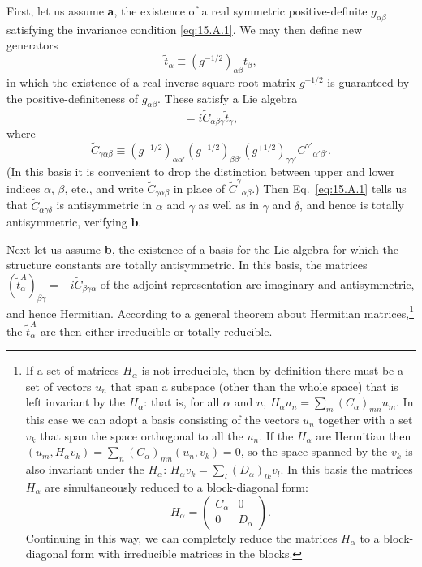 First, let us assume \textbf{a}, the existence of a real symmetric positive-definite $g_{\alpha\beta}$ satisfying the invariance condition \eqref{eq:15.A.1}. We may then define new generators
\begin{equation}
 \widetilde t_\alpha\equiv(g^{-1/2})_{\alpha\beta}t_\beta,
 \tag{15.A.3}\label{eq:15.A.3}
\end{equation}
in which the existence of a real inverse square-root matrix $g^{-1/2}$ is guaranteed by the positive-definiteness of $g_{\alpha\beta}$. These satisfy a Lie algebra
\begin{equation}
 [\widetilde t_\alpha,\widetilde t_\beta]
 =i\widetilde C_{\alpha\beta\gamma}\widetilde t_\gamma,
 \tag{15.A.4}\label{eq:15.A.4}
\end{equation}
where
\begin{equation}
 \widetilde C_{\gamma\alpha\beta}
 \equiv(g^{-1/2})_{\alpha\alpha'}(g^{-1/2})_{\beta\beta'}
 (g^{+1/2})_{\gamma\gamma'}C^{\gamma'}{}_{\alpha'\beta'}.
 \tag{15.A.5}\label{eq:15.A.5}
\end{equation}
(In this basis it is convenient to drop the distinction between upper and lower indices $\alpha$, $\beta$, etc., and write $\widetilde C_{\gamma\alpha\beta}$ in place of $\widetilde C^\gamma{}_{\alpha\beta}$.) Then Eq.~\eqref{eq:15.A.1} tells us that $\widetilde C_{\alpha\gamma\delta}$ is antisymmetric in $\alpha$ and $\gamma$ as well as in $\gamma$ and $\delta$, and hence is totally antisymmetric, verifying \textbf{b}.

Next let us assume \textbf{b}, the existence of a basis for the Lie algebra for which the structure constants are totally antisymmetric. In this basis, the matrices $(\widetilde t^A_\alpha)_{\beta\gamma}=-i\widetilde C_{\beta\gamma\alpha}$ of the adjoint representation are imaginary and antisymmetric, and hence Hermitian. According to a general theorem about Hermitian matrices,\footnote{If a set of matrices $H_\alpha$ is not irreducible, then by definition there must be a set of vectors $u_n$ that span a subspace (other than the whole space) that is left invariant by the $H_\alpha$: that is, for all $\alpha$ and $n$, $H_\alpha u_n=\sum_m(C_\alpha)_{mn}u_m$. In this case we can adopt a basis consisting of the vectors $u_n$ together with a set $v_k$ that span the space orthogonal to all the $u_n$. If the $H_\alpha$ are Hermitian then $(u_m,H_\alpha v_k)=\sum_n(C_\alpha)_{mn}(u_n,v_k)=0$, so the space spanned by the $v_k$ is also invariant under the $H_\alpha$: $H_\alpha v_k=\sum_l(D_\alpha)_{lk}v_l$. In this basis the matrices $H_\alpha$ are simultaneously reduced to a block-diagonal form:
\[
 H_\alpha=\begin{pmatrix}C_\alpha&0\\0&D_\alpha\end{pmatrix}.
\]
Continuing in this way, we can completely reduce the matrices $H_\alpha$ to a block-diagonal form with irreducible matrices in the blocks.} the $\widetilde t^A_\alpha$ are then either irreducible or totally reducible.

